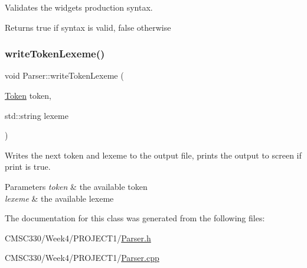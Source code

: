 Validates the widgets production syntax. \begin{DoxyReturn}{Returns}
true if syntax is valid, false otherwise 
\end{DoxyReturn}
\hypertarget{class_parser_a70c67e7914ab1daad785f3d96ca40b6a}{}\label{class_parser_a70c67e7914ab1daad785f3d96ca40b6a} 
\subsubsection{\texorpdfstring{write\+Token\+Lexeme()}{writeTokenLexeme()}}
{\footnotesize\ttfamily void Parser\+::write\+Token\+Lexeme (\begin{DoxyParamCaption}\item[{\hyperlink{_lexer_8h_a6a9e93b081bad7fc74c17306fb168c1f}{Token}}]{token,  }\item[{std\+::string}]{lexeme }\end{DoxyParamCaption})\hspace{0.3cm}{\ttfamily [private]}}

Writes the next token and lexeme to the output file, prints the output to screen if print is true. 
\begin{DoxyParams}{Parameters}
{\em token} & the available token \\
\hline
{\em lexeme} & the available lexeme \\
\hline
\end{DoxyParams}


The documentation for this class was generated from the following files\+:\begin{DoxyCompactItemize}
\item 
C\+M\+S\+C330/\+Week4/\+P\+R\+O\+J\+E\+C\+T1/\hyperlink{_parser_8h}{Parser.\+h}\item 
C\+M\+S\+C330/\+Week4/\+P\+R\+O\+J\+E\+C\+T1/\hyperlink{_parser_8cpp}{Parser.\+cpp}\end{DoxyCompactItemize}
